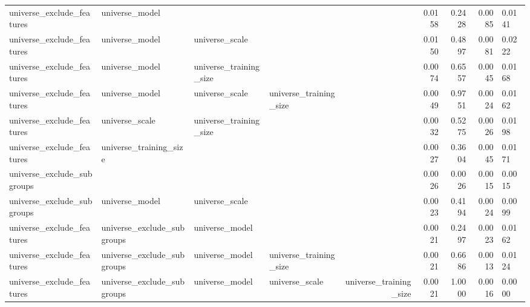 \begin{table}
\begin{tabular}{llllrrrr}
 universe_exclude_features &             universe_model &                        &                        &                        &                0.0158 &           0.2428 &         0.0085 &    0.0141 \\
 universe_exclude_features &             universe_model &         universe_scale &                        &                        &                0.0150 &           0.4897 &         0.0081 &    0.0222 \\
 universe_exclude_features &             universe_model & universe_training_size &                        &                        &                0.0074 &           0.6557 &         0.0045 &    0.0168 \\
 universe_exclude_features &             universe_model &         universe_scale & universe_training_size &                        &                0.0049 &           0.9751 &         0.0024 &    0.0162 \\
 universe_exclude_features &             universe_scale & universe_training_size &                        &                        &                0.0032 &           0.5275 &         0.0026 &    0.0198 \\
 universe_exclude_features &     universe_training_size &                        &                        &                        &                0.0027 &           0.3604 &         0.0045 &    0.0171 \\
universe_exclude_subgroups &                            &                        &                        &                        &                0.0026 &           0.0026 &         0.0015 &    0.0015 \\
universe_exclude_subgroups &             universe_model &         universe_scale &                        &                        &                0.0023 &           0.4194 &         0.0024 &    0.0099 \\
 universe_exclude_features & universe_exclude_subgroups &         universe_model &                        &                        &                0.0021 &           0.2497 &         0.0023 &    0.0162 \\
 universe_exclude_features & universe_exclude_subgroups &         universe_model & universe_training_size &                        &                0.0021 &           0.6686 &         0.0013 &    0.0124 \\
 universe_exclude_features & universe_exclude_subgroups &         universe_model &         universe_scale & universe_training_size &                0.0021 &           1.0000 &         0.0016 &    0.0000 \\

\end{tabular}
\end{table}
